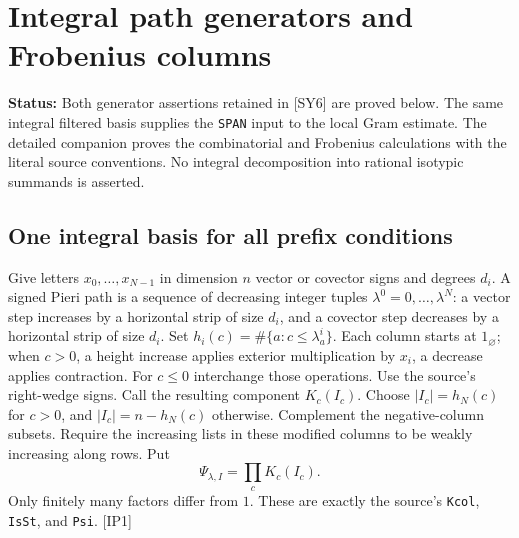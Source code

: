 \documentclass[11pt,a4paper]{article}
\numberwithin{equation}{section}
\theoremstyle{remark}\newtheorem{remark}[theorem]{Remark}
\newcommand{\status}[1]{\textbf{Status:} #1}
\begin{document}
\section{Integral path generators and Frobenius columns}
\label{sec:path-generators}

\status{Both generator assertions retained in [SY6] are proved below. The same integral filtered basis supplies the \texttt{SPAN} input to the local Gram estimate. The detailed companion proves the combinatorial and Frobenius calculations with the literal source conventions. No integral decomposition into rational isotypic summands is asserted.}

\subsection{One integral basis for all prefix conditions}

Give letters $x_0,\ldots,x_{N-1}$ in dimension $n$ vector or covector signs and degrees $d_i$. A signed Pieri path is a sequence of decreasing integer tuples $\lambda^0=0,\ldots,\lambda^N$: a vector step increases by a horizontal strip of size $d_i$, and a covector step decreases by a horizontal strip of size $d_i$. Set $h_i(c)=\#\{a:c\le\lambda^i_a\}$. Each column starts at $1_{\varnothing}$; when $c>0$, a height increase applies exterior multiplication by $x_i$, a decrease applies contraction. For $c\le0$ interchange those operations. Use the source's right-wedge signs. Call the resulting component $K_c(I_c)$. Choose $|I_c|=h_N(c)$ for $c>0$, and $|I_c|=n-h_N(c)$ otherwise. Complement the negative-column subsets. Require the increasing lists in these modified columns to be weakly increasing along rows. Put
\[
 \Psi_{\lambda,I}=\prod_cK_c(I_c).
 \tag{IP.1}
\]
Only finitely many factors differ from $1$. These are exactly the source's \texttt{Kcol}, \texttt{IsSt}, and \texttt{Psi}. \textsf{[IP1]}\cite{path-basis,path-symbol}
\end{document}
